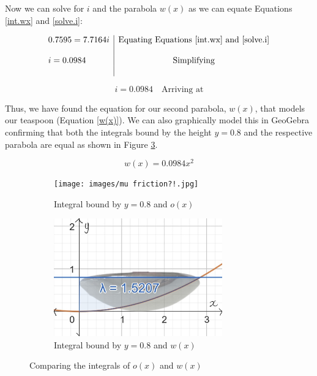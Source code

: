 \documentclass[12pt]{article}
\begin{document}
Now we can solve for $i$ and the parabola $w(x)$ as we can equate Equations \ref{int.wx} and \ref{solve.i}:

$$
\begin{array}{l|c}
    0.7595 = 7.7164i & \text{Equating Equations \ref{int.wx} and \ref{solve.i}} \\ \\
    i = 0.0984 & \text{Simplifying} \\ \\
 \end{array}
$$

\begin{equation}\label{solve.i2}
    \boxed{i = 0.0984}  \quad \text{Arriving at}
\end{equation}

Thus, we have found the equation for our second parabola, $w(x)$, that models our teaspoon (Equation \ref{w(x)}). We can also graphically model this in GeoGebra confirming that both the integrals bound by the height $y=0.8$ and the respective parabola are equal as shown in Figure \ref{fig:para2.graph}.

\vspace{-5mm}

\begin{equation}\label{w(x)}
    \boxed{w(x) = 0.0984x^2}
\end{equation}

\begin{figure}[h]
     \centering
     \begin{subfigure}[b]{0.45\textwidth}
         \centering
         \texttt{[image: images/mu friction?!.jpg]}
         \caption{Integral bound by $y=0.8$ and $o(x)$}
         \label{fig:ox.graph}
     \end{subfigure}
     \hfill
     \begin{subfigure}[b]{0.45\textwidth}
         \centering
         \includegraphics[width=0.8\textwidth]{images/lambda babay.jpg}
         \caption{Integral bound by $y=0.8$ and $w(x)$}
         \label{fig:wx.graph}
     \end{subfigure}
     \hfill
        \caption{Comparing the integrals of $o(x)$ and $w(x)$}
        \label{fig:para2.graph}
\end{figure}
\end{document}
